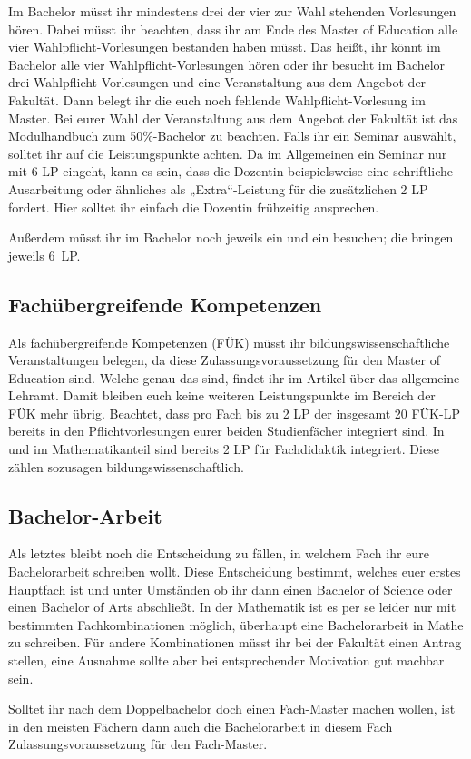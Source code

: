 Im Bachelor müsst ihr mindestens drei der vier zur Wahl stehenden Vorlesungen hören. Dabei müsst ihr beachten, dass ihr am Ende des Master of Education alle vier Wahlpflicht-Vorlesungen bestanden haben müsst. Das heißt, ihr könnt im Bachelor alle vier Wahlpflicht-Vorlesungen hören oder ihr besucht im Bachelor drei Wahlpflicht-Vorlesungen und eine Veranstaltung aus dem Angebot der Fakultät. Dann belegt ihr die euch noch fehlende Wahlpflicht-Vorlesung im Master. Bei eurer Wahl der Veranstaltung aus dem Angebot der Fakultät ist das Modulhandbuch zum 50\%-Bachelor zu beachten. Falls ihr ein Seminar auswählt, solltet ihr auf die Leistungspunkte achten. Da im Allgemeinen ein Seminar nur mit 6 \gls{LP} eingeht, kann es sein, dass die Dozentin beispielsweise eine schriftliche Ausarbeitung oder ähnliches als „Extra“-Leistung für die zusätzlichen 2 \gls{LP} fordert. Hier solltet ihr einfach die Dozentin frühzeitig ansprechen.

Außerdem müsst ihr im Bachelor noch jeweils ein  und ein  besuchen; die bringen jeweils 6~\gls{LP}.

\subsection{Fachübergreifende Kompetenzen}

Als fachübergreifende Kompetenzen (FÜK) müsst ihr bildungswissenschaftliche Veranstaltungen belegen, da diese Zulassungsvoraussetzung für den Master of Education sind. Welche genau das sind, findet ihr im Artikel über das allgemeine Lehramt. Damit bleiben euch keine weiteren Leistungspunkte im Bereich der FÜK mehr übrig. Beachtet, dass pro Fach bis zu 2 \gls{LP} der insgesamt 20 FÜK-\gls{LP} bereits in den Pflichtvorlesungen eurer beiden Studienfächer integriert sind. In  und  im Mathematikanteil sind bereits 2 \gls{LP} für Fachdidaktik integriert. Diese zählen sozusagen bildungswissenschaftlich.

\subsection{Bachelor-Arbeit}

Als letztes bleibt noch die Entscheidung zu fällen, in welchem Fach ihr eure Bachelorarbeit schreiben wollt. Diese Entscheidung bestimmt, welches euer erstes Hauptfach ist und unter Umständen ob ihr dann einen Bachelor of Science oder einen Bachelor of Arts abschließt. In der Mathematik ist es per se leider nur mit bestimmten Fachkombinationen möglich, überhaupt eine Bachelorarbeit in Mathe zu schreiben. Für andere Kombinationen müsst ihr bei der Fakultät einen Antrag stellen, eine Ausnahme sollte aber bei entsprechender Motivation gut machbar sein.

Solltet ihr nach dem Doppelbachelor doch einen Fach-Master machen wollen, ist in den meisten Fächern dann auch die Bachelorarbeit in diesem Fach Zulassungsvoraussetzung für den Fach-Master.
